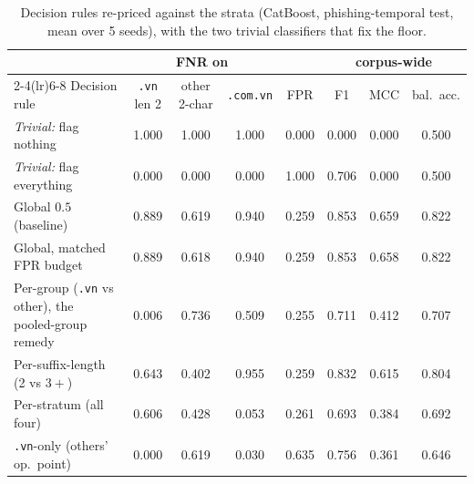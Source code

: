 \begin{table}[t]\centering
\caption{Decision rules re-priced against the strata (CatBoost, phishing-temporal test, mean over 5 seeds), with the two trivial classifiers that fix the floor.}
\label{tab:rules}
\footnotesize\setlength{\tabcolsep}{3.5pt}
\begin{tabular}{l ccc c ccc}\toprule
& \multicolumn{3}{c}{FNR on} & & \multicolumn{3}{c}{corpus-wide} \\
\cmidrule(lr){2-4}\cmidrule(lr){6-8}
Decision rule & \texttt{.vn} len 2 & other 2-char & \texttt{.com.vn} & FPR & F1 & MCC & bal.\ acc. \\ \midrule
\emph{Trivial:} flag nothing & 1.000 & 1.000 & 1.000 & 0.000 & 0.000 & 0.000 & 0.500 \\
\emph{Trivial:} flag everything & 0.000 & 0.000 & 0.000 & 1.000 & 0.706 & 0.000 & 0.500 \\
\midrule
Global $0.5$ (baseline) & 0.889 & 0.619 & 0.940 & 0.259 & 0.853 & 0.659 & 0.822 \\
Global, matched FPR budget & 0.889 & 0.618 & 0.940 & 0.259 & 0.853 & 0.658 & 0.822 \\
Per-group (\texttt{.vn} vs other), the pooled-group remedy & 0.006 & 0.736 & 0.509 & 0.255 & 0.711 & 0.412 & 0.707 \\
Per-suffix-length (2 vs $3+$) & 0.643 & 0.402 & 0.955 & 0.259 & 0.832 & 0.615 & 0.804 \\
Per-stratum (all four) & 0.606 & 0.428 & 0.053 & 0.261 & 0.693 & 0.384 & 0.692 \\
\texttt{.vn}-only (others' op.\ point) & 0.000 & 0.619 & 0.030 & 0.635 & 0.756 & 0.361 & 0.646 \\
\bottomrule\end{tabular}\end{table}
